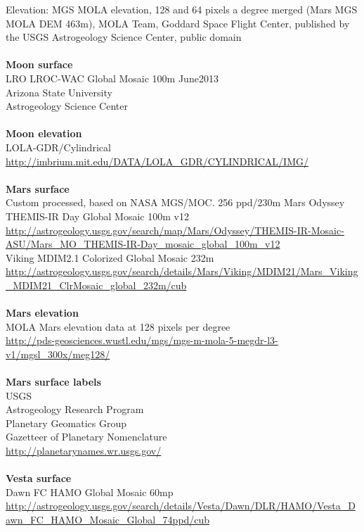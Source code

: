 \documentclass[Orbiter User Manual.tex]{subfiles}
\begin{document}
Elevation: MGS MOLA elevation, 128 and 64 pixels a degree merged (Mars MGS MOLA DEM 463m), MOLA Team, Goddard Space Flight Center, published by the USGS Astrogeology Science Center, public domain\\
\\
\textbf{Moon surface}\\
LRO LROC-WAC Global Mosaic 100m June2013\\
Arizona State University\\
Astrogeology Science Center\\
\\
\textbf{Moon elevation}\\
LOLA-GDR/Cylindrical\\
\url{http://imbrium.mit.edu/DATA/LOLA_GDR/CYLINDRICAL/IMG/}\\
\\
\textbf{Mars surface}\\
Custom processed, based on NASA MGS/MOC. 256 ppd/230m Mars Odyssey THEMIS-IR Day Global Mosaic 100m v12\\
\url{http://astrogeology.usgs.gov/search/map/Mars/Odyssey/THEMIS-IR-Mosaic-ASU/Mars_MO_THEMIS-IR-Day_mosaic_global_100m_v12}\\
Viking MDIM2.1 Colorized Global Mosaic 232m\\
\url{http://astrogeology.usgs.gov/search/details/Mars/Viking/MDIM21/Mars_Viking_MDIM21_ClrMosaic_global_232m/cub}\\
\\
\textbf{Mars elevation}\\
MOLA Mars elevation data at 128 pixels per degree\\
\url{http://pds-geosciences.wustl.edu/mgs/mgs-m-mola-5-megdr-l3-v1/mgsl_300x/meg128/}\\
\\
\textbf{Mars surface labels}\\
USGS\\
Astrogeology Research Program\\
Planetary Geomatics Group\\
Gazetteer of Planetary Nomenclature\\
\url{http://planetarynames.wr.usgs.gov/}\\
\\
\textbf{Vesta surface}\\
Dawn FC HAMO Global Mosaic 60mp\\
\url{http://astrogeology.usgs.gov/search/details/Vesta/Dawn/DLR/HAMO/Vesta_Dawn_FC_HAMO_Mosaic_Global_74ppd/cub}\\
\end{document}

